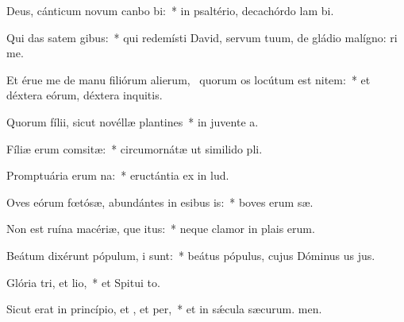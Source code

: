 \item Deus, cánticum novum canbo bi:~* in psaltério, decachórdo lam bi.
\item Qui das satem gibus:~* qui redemísti David, servum tuum, de gládio malígno: ri me.
\item Et érue me de manu filiórum alierum,~\pscross{} quorum os locútum est nitem:~* et déxtera eórum, déxtera inquitis.
\item Quorum fílii, sicut novéllæ plantines~* in juvente a.
\item Fíliæ erum comsitæ:~* circumornátæ ut similido pli.
\item Promptuária erum na:~* eructántia ex  in lud.
\item Oves eórum fœtósæ, abundántes in esibus is:~* boves erum sæ.
\item Non est ruína macériæ, que itus:~* neque clamor in plais erum.
\item Beátum dixérunt pópulum, i  sunt:~* beátus pópulus, cujus Dóminus us jus.
\item Glória tri, et lio,~* et Spitui to.
\item Sicut erat in princípio, et , et per,~* et in sǽcula sæcurum. men.
